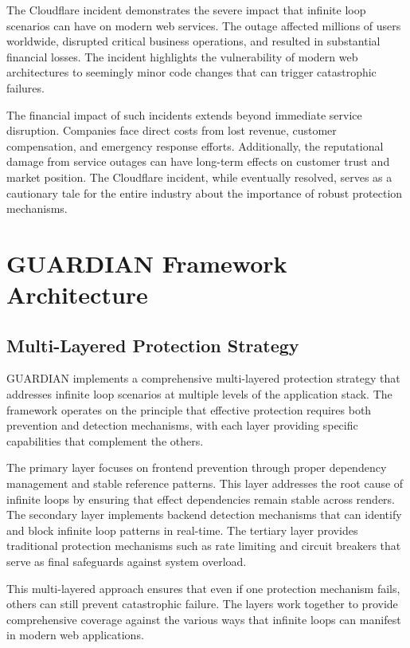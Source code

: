 \documentclass[10pt]{article}
\begin{document}
The Cloudflare incident demonstrates the severe impact that infinite loop scenarios can have on modern web services. The outage affected millions of users worldwide, disrupted critical business operations, and resulted in substantial financial losses. The incident highlights the vulnerability of modern web architectures to seemingly minor code changes that can trigger catastrophic failures.

The financial impact of such incidents extends beyond immediate service disruption. Companies face direct costs from lost revenue, customer compensation, and emergency response efforts. Additionally, the reputational damage from service outages can have long-term effects on customer trust and market position. The Cloudflare incident, while eventually resolved, serves as a cautionary tale for the entire industry about the importance of robust protection mechanisms.

\section{GUARDIAN Framework Architecture}

\subsection{Multi-Layered Protection Strategy}

GUARDIAN implements a comprehensive multi-layered protection strategy that addresses infinite loop scenarios at multiple levels of the application stack. The framework operates on the principle that effective protection requires both prevention and detection mechanisms, with each layer providing specific capabilities that complement the others.

The primary layer focuses on frontend prevention through proper dependency management and stable reference patterns. This layer addresses the root cause of infinite loops by ensuring that effect dependencies remain stable across renders. The secondary layer implements backend detection mechanisms that can identify and block infinite loop patterns in real-time. The tertiary layer provides traditional protection mechanisms such as rate limiting and circuit breakers that serve as final safeguards against system overload.

This multi-layered approach ensures that even if one protection mechanism fails, others can still prevent catastrophic failure. The layers work together to provide comprehensive coverage against the various ways that infinite loops can manifest in modern web applications.
\end{document}
